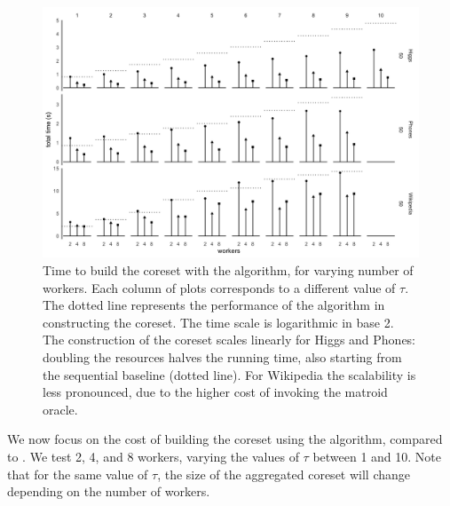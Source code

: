 \begin{figure}
    \includegraphics[width=\textwidth]{mr-time}
    \caption{
        \label{fig:mr-coreset-time}
        Time to build the coreset with the \mapr algorithm, for varying number of workers.
        Each column of plots corresponds to a different value of $\tau$.
        The dotted line represents the performance of the \seq algorithm in constructing the coreset.
        The time scale is logarithmic in base 2.
        The construction of the coreset scales linearly for Higgs and Phones: doubling 
        the resources halves the running time, also starting from the sequential baseline 
        (dotted line). For Wikipedia the scalability is 
        less pronounced, due to the higher cost of invoking the matroid oracle.
    }
\end{figure}

We now focus on the cost of building the coreset using the \mapr algorithm, compared to \seq.
We test 2, 4, and 8 workers, varying the values of $\tau$ between 1 and 10. Note that for the same value
of $\tau$, the size of the aggregated coreset will change depending on the number of workers.

